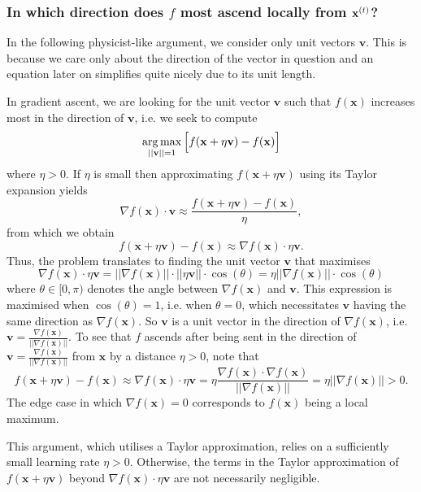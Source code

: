 \documentclass[11pt]{article}
\begin{document}
\subsubsection{In which direction does $f$ most ascend locally from $\mathbf{x}^{(t)}$?}
In the following physicist-like argument, we consider only unit vectors $\mathbf{v}$. This is because we care only about the direction of the vector in question and an equation later on simplifies quite nicely due to its unit length. 

In gradient ascent, we are looking for the unit vector $\mathbf{v}$ such that $f(\mathbf{x})$ increases most in the direction of $\mathbf{v}$, i.e. we seek to compute
$$\operatorname*{arg\,max}_{||\mathbf{v}||=1}\Big[f(\mathbf{x}+\eta\mathbf{v})-f(\mathbf{x})\Big]$$
where $\eta>0$. If $\eta$ is small then approximating $f(\mathbf{x}+\eta\mathbf{v})$ using its Taylor expansion yields
$$
\nabla f(\mathbf{x})\cdot\mathbf{v}\approx\frac{f(\mathbf{x}+\eta\mathbf{v})-f(\mathbf{x})}{\eta},
$$
from which we obtain
$$
f(\mathbf{x}+\eta\mathbf{v})-f(\mathbf{x})
\approx
\nabla f(\mathbf{x})\cdot\eta\mathbf{v}.
$$
Thus, the problem translates to finding the unit vector $\mathbf{v}$ that maximises
$$
\nabla f(\mathbf{x})\cdot\eta\mathbf{v}=||\nabla f(\mathbf{x})||\cdot||\eta\mathbf{v}||\cdot\cos(\theta)=\eta||\nabla f(\mathbf{x})||\cdot\cos(\theta)
$$
where $\theta\in[0,\pi)$ denotes the angle between $\nabla f(\mathbf{x})$ and $\mathbf{v}$. This expression is maximised when $\cos(\theta)=1$, i.e. when $\theta=0$, which necessitates $\mathbf{v}$ having the same direction as $\nabla f(\mathbf{x})$. So $\mathbf{v}$ is a unit vector in the direction of $\nabla f(\mathbf{x})$, i.e. $\mathbf{v}=\frac{\nabla f(\mathbf{x})}{||\nabla f(\mathbf{x})||}$. To see that $f$ ascends after being sent in the direction of $\mathbf{v}=\frac{\nabla f(\mathbf{x})}{||\nabla f(\mathbf{x})||}$ from $\mathbf{x}$ by a distance $\eta>0$, note that
$$
f(\mathbf{x}+\eta\mathbf{v})-f(\mathbf{x})
\approx
\nabla f(\mathbf{x})\cdot\eta\mathbf{v}
=
\eta\frac{\nabla f(\mathbf{x})\cdot\nabla f(\mathbf{x})}{||\nabla f(\mathbf{x})||}
=
\eta||\nabla f(\mathbf{x})||
>
0.
$$
The edge case in which $\nabla f(\mathbf{x})=0$ corresponds to $f(\mathbf{x})$ being a local maximum.

\begin{tcolorbox}[title={\centering\centering\textbf{A note on using Taylor approximations}}, colback=myLightBlue, colbacktitle=myDarkBlue, colframe=myDarkBlue, coltitle=white]
    This argument, which utilises a Taylor approximation, relies on a sufficiently small learning rate $\eta>0$. Otherwise, the terms in the Taylor approximation of $f(\mathbf{x}+\eta\mathbf{v})$ beyond $\nabla f(\mathbf{x})\cdot\eta\mathbf{v}$ are not necessarily negligible.
\end{tcolorbox}
\end{document}
